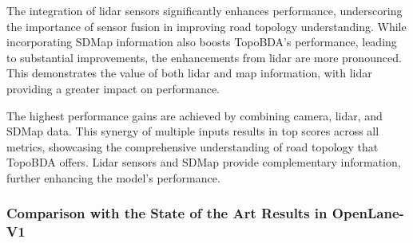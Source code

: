 The integration of lidar sensors significantly enhances performance, underscoring the importance of sensor fusion in improving road topology understanding. While incorporating SDMap information also boosts TopoBDA's performance, leading to substantial improvements, the enhancements from lidar are more pronounced. This demonstrates the value of both lidar and map information, with lidar providing a greater impact on performance.

The highest performance gains are achieved by combining camera, lidar, and SDMap data. This synergy of multiple inputs results in top scores across all metrics, showcasing the comprehensive understanding of road topology that TopoBDA offers. Lidar sensors and SDMap provide complementary information, further enhancing the model's performance.


\subsubsection{Comparison with the State of the Art Results in OpenLane-V1}
\label{sec: exp_comparison_with_sota_olv1}

